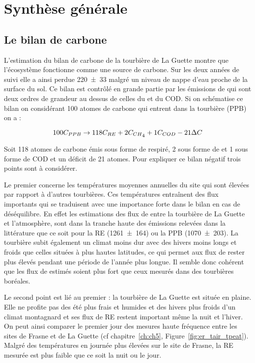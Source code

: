 \section*{Synthèse générale}


\subsection*{Le bilan de carbone}

L'estimation du bilan de carbone de la tourbière de La Guette montre que l'écosystème fonctionne comme une source de carbone.
Sur les deux années de suivi elle a ainsi perdue \SI{220(33)}{\gcma} malgré un niveau de nappe d'eau proche de la surface du sol.
Ce bilan est contrôlé en grande partie par les émissions de \coo qui sont deux ordres de grandeur au dessus de celles du \chh et du COD.
Si on schématise ce bilan on considérant 100 atomes de carbone qui entrent dans la tourbière (PPB) on a :

\begin{equation}
100C_{PPB} \rightarrow 118C_{RE} + 2C_{CH\textsubscript{4}} + 1C_{COD} -21\Delta C
\end{equation}

Soit 118 atomes de carbone émis sous forme de \coo respiré, 2 sous forme de \chh et 1 sous forme de COD et un déficit de 21 atomes.
Pour expliquer ce bilan négatif trois points sont à considérer.

Le premier concerne les températures moyennes annuelles du site qui sont élevées par rapport à d'autres tourbières.
Ces températures entraînent des flux importants qui se traduisent avec une importance forte dans le bilan en cas de déséquilibre.
En effet les estimations des flux de \coo entre la tourbière de La Guette et l'atmosphère, sont dans la tranche haute des émissions relevées dans la littérature que ce soit pour la RE (\SI{1261(164)}{\gcma}) ou la PPB (\SI{1070(203)}{\gcma}).
La tourbière subit également un climat moins dur avec des hivers moins longs et froids que celles situées à plus hautes latitudes, ce qui permet aux flux de rester plus élevés pendant une période de l'année plus longue.
Il semble donc cohérent que les flux de \coo estimés soient plus fort que ceux mesurés dans des tourbières boréales.

Le second point est lié au premier : la tourbière de La Guette est située en plaine. 
Elle ne profite pas des été plus frais et humides et des hivers plus froids d'un climat montagnard et ses flux de RE restent important même la nuit et l'hiver.
On peut ainsi comparer le premier jour des mesures haute fréquence entre les sites de Frasne et de La Guette (cf chapitre~\ref{ch:ch5}, Figure~\ref{fig:er_tair_tpeat}).
Malgré des températures en journée plus élevées sur le site de Frasne, la RE mesurée est plus faible que ce soit la nuit ou le jour.

